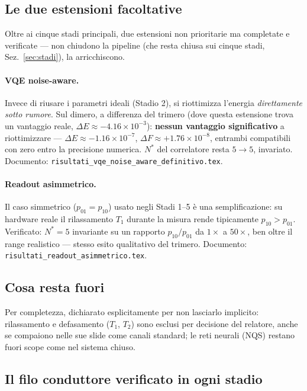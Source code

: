 \documentclass[11pt,a4paper]{article}
\begin{document}
\subsection{Le due estensioni facoltative}
\label{sec:estensioni-dimero}

Oltre ai cinque stadi principali, due estensioni non prioritarie ma
completate e verificate --- non chiudono la pipeline (che resta chiusa
sui cinque stadi, Sez.~\ref{sec:stadi}), la arricchiscono.

\paragraph{VQE noise-aware.} Invece di riusare i parametri ideali
(Stadio 2), si riottimizza l'energia \emph{direttamente sotto rumore}.
Sul dimero, a differenza del trimero (dove questa estensione trova un
vantaggio reale, $\Delta E\approx-4.16\times10^{-3}$):
\textbf{nessun vantaggio significativo} a riottimizzare --- $\Delta
E\approx-1.16\times10^{-7}$, $\Delta F\approx+1.76\times10^{-8}$,
entrambi compatibili con zero entro la precisione numerica. $N^*$ del
correlatore resta $5\to5$, invariato. Documento:
\texttt{risultati\_vqe\_noise\_aware\_definitivo.tex}.

\paragraph{Readout asimmetrico.} Il caso simmetrico ($p_{01}=p_{10}$)
usato negli Stadi 1--5 è una semplificazione: su hardware reale il
rilassamento $T_1$ durante la misura rende tipicamente $p_{10}>p_{01}$.
Verificato: $N^*=5$ invariante su un rapporto $p_{10}/p_{01}$ da
$1\times$ a $50\times$, ben oltre il range realistico --- stesso esito
qualitativo del trimero. Documento:
\texttt{risultati\_readout\_asimmetrico.tex}.

\subsection{Cosa resta fuori}

Per completezza, dichiarato esplicitamente per non lasciarlo implicito:
rilassamento e defasamento ($T_1$, $T_2$) sono esclusi per decisione
del relatore, anche se compaiono nelle sue slide come canali standard;
le reti neurali (NQS) restano fuori scope come nel sistema chiuso.

\subsection{Il filo conduttore verificato in ogni stadio}
\end{document}
